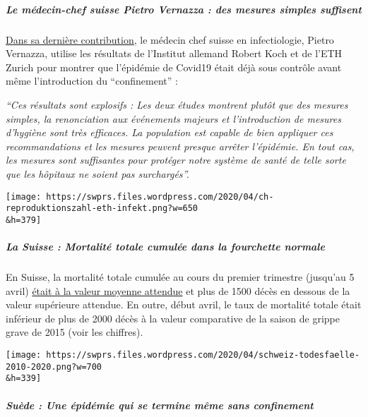 \hypertarget{le-muxe9decin-chef-suisse-pietro-vernazza--des-mesures-simples-suffisent}{%
\subparagraph{\texorpdfstring{\textbf{Le médecin-chef suisse Pietro
Vernazza : des mesures simples
suffisent}}{Le médecin-chef suisse Pietro Vernazza : des mesures simples suffisent}}\label{le-muxe9decin-chef-suisse-pietro-vernazza--des-mesures-simples-suffisent}}

\href{https://infekt.ch/2020/04/sind-wir-tatsaechlich-im-blindflug/}{Dans
sa dernière contribution}, le médecin chef suisse en infectiologie,
Pietro Vernazza, utilise les résultats de l'Institut allemand Robert
Koch et de l'ETH Zurich pour montrer que l'épidémie de Covid19 était
déjà sous contrôle avant même l'introduction du ``confinement'' :

\emph{``Ces résultats sont explosifs : Les deux études montrent plutôt
que des mesures simples, la renonciation aux événements majeurs et
l'introduction de mesures d'hygiène sont très efficaces. La population
est capable de bien appliquer ces recommandations et les mesures peuvent
presque arrêter l'épidémie. En tout cas, les mesures sont suffisantes
pour protéger notre système de santé de telle sorte que les hôpitaux ne
soient pas surchargés''.}

\texttt{[image: https://swprs.files.wordpress.com/2020/04/ch-reproduktionszahl-eth-infekt.png?w=650\\\&h=379]}

\hypertarget{la-suisse--mortalituxe9-totale-cumuluxe9e-dans-la-fourchette-normale}{%
\subparagraph{\texorpdfstring{\textbf{La Suisse : Mortalité totale
cumulée dans la fourchette
normale}}{La Suisse : Mortalité totale cumulée dans la fourchette normale}}\label{la-suisse--mortalituxe9-totale-cumuluxe9e-dans-la-fourchette-normale}}

En Suisse, la mortalité totale cumulée au cours du premier trimestre
(jusqu'au 5 avril)
\href{https://swprs.files.wordpress.com/2020/04/ch-sterblichkeit-kumuliert-q1-2020.pdf}{était
à la valeur moyenne attendue} et plus de 1500 décès en dessous de la
valeur supérieure attendue. En outre, début avril, le taux de mortalité
totale était inférieur de plus de 2000 décès à la valeur comparative de
la saison de grippe grave de 2015 (voir les chiffres).

\texttt{[image: https://swprs.files.wordpress.com/2020/04/schweiz-todesfaelle-2010-2020.png?w=700\\\&h=339]}

\hypertarget{suuxe8de--une-uxe9piduxe9mie-qui-se-termine-muxeame-sans-confinement}{%
\subparagraph{\texorpdfstring{\textbf{Suède : Une épidémie qui se
termine même sans
confinement}}{Suède : Une épidémie qui se termine même sans confinement}}\label{suuxe8de--une-uxe9piduxe9mie-qui-se-termine-muxeame-sans-confinement}}

